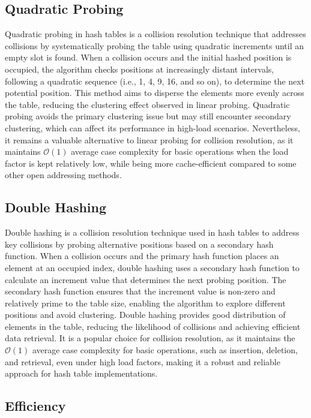 \documentclass[a4paper,9pt]{article}
\begin{document}
\subsection*{Quadratic Probing}

Quadratic probing in hash tables is a collision resolution technique that addresses collisions by systematically probing the table using quadratic increments until an empty slot is found. When a collision occurs 
and the initial hashed position is occupied, the algorithm checks positions at increasingly distant intervals, following a quadratic sequence (i.e., 1, 4, 9, 16, and so on), to determine the next potential position. 
This method aims to disperse the elements more evenly across the table, reducing the clustering effect observed in linear probing. Quadratic probing avoids the primary clustering issue but may still encounter 
secondary clustering, which can affect its performance in high-load scenarios. Nevertheless, it remains a valuable alternative to linear probing for collision resolution, as it maintains $\mathcal{O}(1)$ average 
case complexity for basic operations when the load factor is kept relatively low, while being more cache-efficient compared to some other open addressing methods.

\subsection*{Double Hashing}

Double hashing is a collision resolution technique used in hash tables to address key collisions by probing alternative positions based on a secondary hash function. When a collision occurs and the primary hash 
function places an element at an occupied index, double hashing uses a secondary hash function to calculate an increment value that determines the next probing position. The secondary hash function ensures that 
the increment value is non-zero and relatively prime to the table size, enabling the algorithm to explore different positions and avoid clustering. Double hashing provides good distribution of elements in the table, 
reducing the likelihood of collisions and achieving efficient data retrieval. It is a popular choice for collision resolution, as it maintains the $\mathcal{O}(1)$ average case complexity for basic operations, 
such as insertion, deletion, and retrieval, even under high load factors, making it a robust and reliable approach for hash table implementations.

\subsection*{Efficiency}
\end{document}
